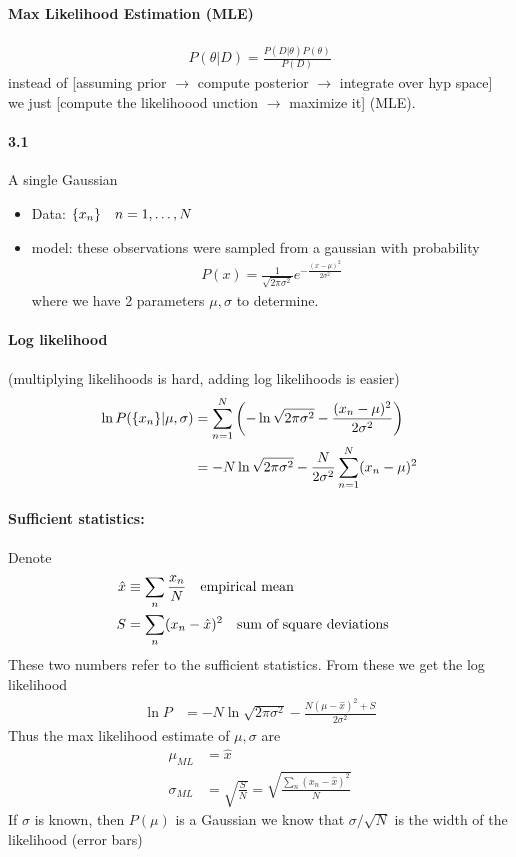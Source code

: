 \documentclass[../main.tex]{subfiles}
\begin{document}
\paragraph{Max Likelihood Estimation (MLE)} 
\begin{align*}
    P(\theta | D) = \frac{P(D | \theta) P(\theta)}{P(D)}
\end{align*}
instead of [assuming prior $\to$ compute posterior $\to$ integrate over hyp space] we just [compute 
the likelihoood unction $\to$ maximize it] (MLE).

\paragraph{3.1} A single Gaussian
\begin{itemize}
    \item Data: $\qt{x_n} \quad n = 1, \dots, N$
    \item model: these observations were sampled from a gaussian with probability
\begin{align*}
    P(x) = \frac{1}{\sqrt{2\pi \sigma^2}} e^{-\frac{(x - \mu)^2}{2\sigma^2}}
\end{align*}
    where we have 2 parameters $\mu, \sigma$ to determine.
\end{itemize}

\paragraph{Log likelihood} (multiplying likelihoods is hard, adding log likelihoods is easier)
\begin{align*}
    \ln P(\{x_n\} | \mu, \sigma) &= 
        \sum_{n=1}^N \qt(-\ln{\sqrt{2\pi \sigma^2}} - \frac{(x_n - \mu)^2}{2\sigma^2}) \\
    &= - N \ln{\sqrt{2\pi \sigma^2}} - \frac{N}{2\sigma^2} \sum_{n=1}^N (x_n - \mu)^2
\end{align*}

\paragraph{Sufficient statistics:} Denote
\begin{align*}
    \hat x &\equiv \sum_n \frac{x_n}{N} \qq{empirical mean} \\
    S &= \sum_n (x_n - \hat x)^2 \qq{sum of square deviations}
\end{align*}
These two numbers refer to the sufficient statistics. From these we get the log likelihood
\begin{align*}
    \ln P &= -N \ln{\sqrt{2\pi \sigma^2}} - \frac{N(\mu - \hat x)^2 + S}{2\sigma^2}
\end{align*}
Thus the max likelihood estimate of $\mu, \sigma$ are
\begin{align*}
    \mu_{ML} &= \hat x \\
    \sigma_{ML} &= \sqrt{\frac{S}{N}} = \sqrt{\frac{\sum_n (x_n - \hat x)^2}{N}} 
\end{align*}
If $\sigma$ is known, then $P(\mu)$ is a Gaussian we know that $\sigma/\sqrt{N}$ is the width of the
likelihood (error bars)
\end{document}
